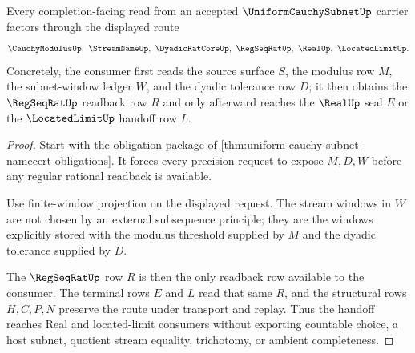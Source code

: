 \begin{theorem}
\label{thm:uniform-cauchy-subnet-regseqrat-handoff}
Every completion-facing read from an accepted $\UniformCauchySubnetUp$ carrier factors through the displayed route
$$
\CauchyModulusUp,\ \StreamNameUp,\ \DyadicRatCoreUp,\ \RegSeqRatUp,\ \RealUp,\ \LocatedLimitUp .
$$
Concretely, the consumer first reads the source surface $S$, the modulus row $M$, the subnet-window ledger $W$, and the dyadic tolerance row $D$; it then obtains the $\RegSeqRatUp$ readback row $R$ and only afterward reaches the $\RealUp$ seal $E$ or the $\LocatedLimitUp$ handoff row $L$.
\end{theorem}
\begin{proof}
Start with the obligation package of \autoref{thm:uniform-cauchy-subnet-namecert-obligations}. It forces every precision request to expose $M,D,W$ before any regular rational readback is available.

Use finite-window projection on the displayed request. The stream windows in $W$ are not chosen by an external subsequence principle; they are the windows explicitly stored with the modulus threshold supplied by $M$ and the dyadic tolerance supplied by $D$.

The $\RegSeqRatUp$ row $R$ is then the only readback row available to the consumer. The terminal rows $E$ and $L$ read that same $R$, and the structural rows $H,C,P,N$ preserve the route under transport and replay. Thus the handoff reaches Real and located-limit consumers without exporting countable choice, a host subnet, quotient stream equality, trichotomy, or ambient completeness.
\end{proof}




